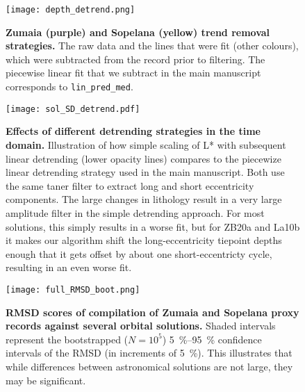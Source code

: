 \documentclass[draft]{agujournal2019}
\begin{document}
\begin{figure}[htbp]
  \centering
  \texttt{[image: depth\_detrend.png]}
  \caption{\label{fig:detrend}
    \textbf{Zumaia (purple) and Sopelana (yellow) trend removal strategies.}
    The raw data and the lines that were fit (other colours), which were subtracted from the record prior to filtering.
    The piecewise linear fit that we subtract in the main manuscript corresponds to \texttt{lin\_pred\_med}.
  }
\end{figure}

\begin{figure}[htb]
  \centering \texttt{[image: sol\_SD\_detrend.pdf]}
  \caption{\label{fig:Lstar-detrend}
  \textbf{Effects of different detrending strategies in the time domain.}
    Illustration of how simple scaling of \gls{L*} with subsequent linear detrending (lower opacity lines)
    compares to the piecewize linear detrending strategy used in the main manuscript.
    Both use the same taner filter to extract long and short eccentricity components.
    The large changes in lithology result in a very large amplitude filter in the simple detrending approach.
    For most solutions, this simply results in a worse fit, but for ZB20a and La10b it makes our algorithm shift the long-eccentricity tiepoint depths enough that it gets offset by about one short-eccentricty cycle, resulting in an even worse fit.
    }
\end{figure}

\begin{figure}[htb]
    \centering
    \texttt{[image: full\_RMSD\_boot.png]}
    \caption{\label{fig:full-RMSD-boot}
        \textbf{\gls{RMSD} scores of compilation of Zumaia and Sopelana proxy records against several orbital solutions.}
        Shaded intervals represent the bootstrapped (\(N = 10^{5}\)) \qtyrange{5}{95}{\percent} confidence intervals of the \gls{RMSD} (in increments of \qty{5}{\percent}).
        This illustrates that while differences between astronomical solutions are not large, they may be significant.
    }
\end{figure}
\end{document}
